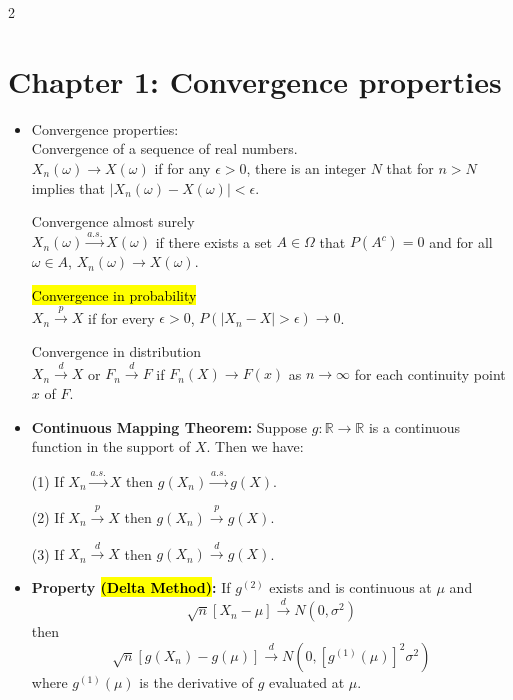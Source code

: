 \documentclass[a4paper,10pt]{article}
\begin{document}
\begin{multicols}{2}
\small


\section*{Chapter 1: Convergence properties}
\begin{itemize}
    \item Convergence properties:\\
    Convergence of a sequence of real numbers.\\  
    \hspace*{1cm}  $X_n(\omega) \to X(\omega)$ if for any $\epsilon > 0$, there is an integer $N$ that for $n > N$ implies that $|X_n(\omega) - X(\omega)| < \epsilon$.  
    
    Convergence almost surely\\
    \hspace*{1cm}  $X_n(\omega) \xrightarrow{a.s.} X(\omega)$ if there exists a set $A \in \Omega$ that $P(A^c) = 0$ and for all $\omega \in A$, $X_n(\omega) \to X(\omega)$.  
    
    \hl{Convergence in probability}\\
    \hspace*{1cm} $X_n \xrightarrow{p} X$ if for every $\epsilon > 0$, $P(|X_n - X| > \epsilon) \to 0$.  
    
   Convergence in distribution\\
    \hspace*{1cm} $X_n \xrightarrow{d} X$ or $F_n \xrightarrow{d} F$ if $F_n(X) \to F(x)$ as $n \to \infty$ for each continuity point $x$ of $F$.

    \item \textbf{Continuous Mapping Theorem:} Suppose \( g: \mathbb{R} \to \mathbb{R} \) is a continuous function in the support of \( X \). Then we have:

    (1) If \( X_n \xrightarrow{a.s.} X \) then \( g(X_n) \xrightarrow{a.s.} g(X) \).
    
    (2) If \( X_n \xrightarrow{p} X \) then \( g(X_n) \xrightarrow{p} g(X) \).
    
    (3) If \( X_n \xrightarrow{d} X \) then \( g(X_n) \xrightarrow{d} g(X) \).

    \item \textbf{Property \hl{(Delta Method)}:} If \( g^{(2)} \) exists and is continuous at \( \mu \) and  
    \[
    \sqrt{n} [X_n - \mu] \xrightarrow{d} N(0, \sigma^2)
    \]
    then  
    \[
    \sqrt{n} [g(X_n) - g(\mu)] \xrightarrow{d} N(0, [g^{(1)}(\mu)]^2 \sigma^2)
    \]
    where \( g^{(1)}(\mu) \) is the derivative of \( g \) evaluated at \( \mu \).



\end{itemize}
\end{multicols}
\end{document}
